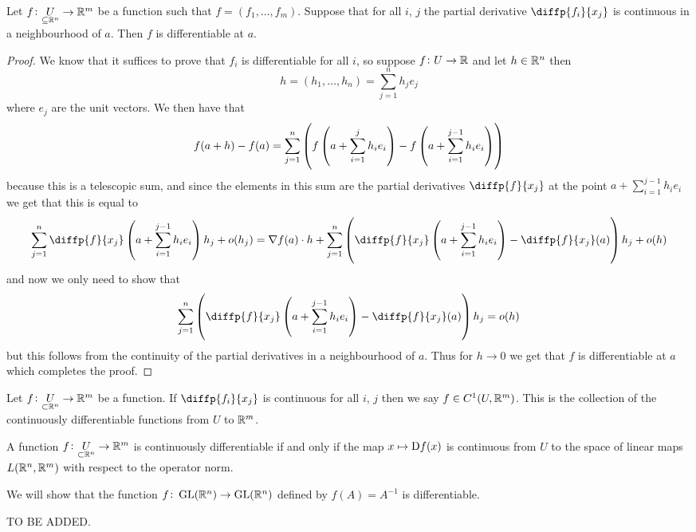 \documentclass[11pt,a4paper]{article}
\begin{document}
\begin{proposition}
  Let $f \colon \underset{\subseteq \mathbb{R}^n}{U} \to \mathbb{R}^m$ be a function
  such that $f = (f_1,\dots,f_m)$.
  Suppose that for all $i$, $j$ the partial derivative $\diffp{{f_i}}{{x_j}}$
  is continuous in a neighbourhood of $a$.
  Then $f$ is differentiable at $a$.
\end{proposition}
\begin{proof}
  We know that it suffices to prove that $f_i$ is differentiable for
  all $i$, so suppose $f \colon U \to \mathbb{R}$ and let $h \in \mathbb{R}^n$ then
  \[
    h = (h_1,\dots,h_n) = \sum_{j=1}^{n} h_j e_j
  \]
  where $e_j$ are the unit vectors.
  We then have that
  \[
    f(a + h) - f(a) =
    \sum_{j=1}^{n}
    \del
    {
      f\del{a + \sum_{i=1}^{j} h_i e_i} -
      f\del{a + \sum_{i=1}^{j - 1} h_i e_i}
    }
  \]
  because this is a telescopic sum, and since the elements in this sum
  are the partial derivatives $\diffp{f}{{x_j}}$ at the point
  $a + \sum_{i=1}^{j - 1} h_i e_i$ we get that this is equal to
  \[
    \sum_{j=1}^{n} \diffp{f}{{x_j}} \del{a + \sum_{i=1}^{j - 1} h_i e_i} h_j
    + o(h_j) =
    \nabla f(a) \cdot h +
    \sum_{j=1}^{n} \del{\diffp{f}{{x_j}} 
    \del{a + \sum_{i=1}^{j - 1} h_i e_i} - \diffp{f}{{x_j}}(a)} h_j
    + o(h)
  \]
  and now we only need to show that
  \[
    \sum_{j=1}^{n} \del{\diffp{f}{{x_j}} 
    \del{a + \sum_{i=1}^{j - 1} h_i e_i} - \diffp{f}{{x_j}}(a)} h_j
    = o(h)
  \]
  but this follows from the continuity of the partial derivatives in a
  neighbourhood of $a$.
  Thus for $h \to 0$ we get that $f$ is differentiable at $a$ which completes
  the proof.
\end{proof}

\begin{remark}
  Let $f \colon \underset{\subset \mathbb{R}^n}{U} \to \mathbb{R}^m$ be a function.
  If $\diffp{f_i}{{x_j}}$ is continuous for all $i$, $j$ then we say
  $f \in C^1(U,\mathbb{R}^m)$.
  This is the collection of the continuously differentiable functions from
  $U$ to $\mathbb{R}^m$.
\end{remark}
\begin{remark}
  A function $f \colon \underset{\subset \mathbb{R}^n}{U} \to \mathbb{R}^m$ is continuously
  differentiable if and only if the map $x \mapsto \Dif f(x)$ is continuous
  from $U$ to the space of linear maps $L(\mathbb{R}^n,\mathbb{R}^m)$ with respect to the
  operator norm.
\end{remark}
\begin{example}
  We will show that the function $f \colon \operatorname{GL}(\mathbb{R}^n) \to \operatorname{GL}(\mathbb{R}^n)$ defined
  by $f(A) = A^{-1}$ is differentiable.

  TO BE ADDED.
\end{example}
\end{document}
